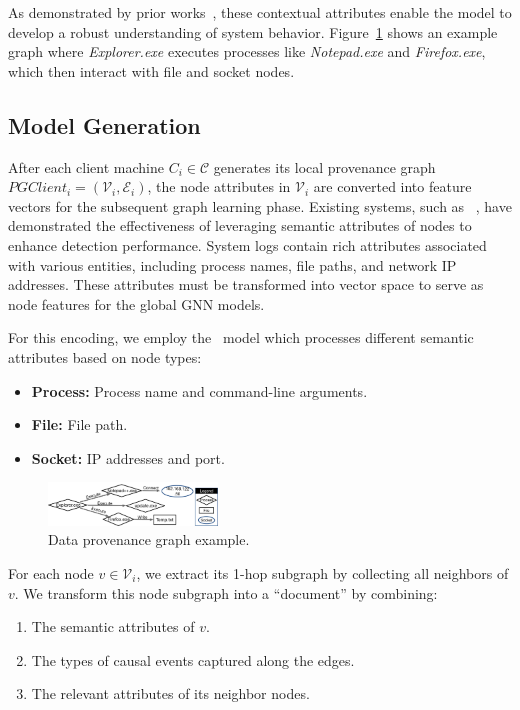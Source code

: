 As demonstrated by prior works~\cite{flash2024,cheng2023kairos}, these contextual attributes enable the model to develop a robust understanding of system behavior. Figure~\ref{provexp} shows an example graph where \textit{Explorer.exe} executes processes like \textit{Notepad.exe} and \textit{Firefox.exe}, which then interact with file and socket nodes.



\subsection{\wordvec Model Generation}
\label{sub:word2vec:model}

After each client machine \(C_i\in \mathcal{C}\) generates its local provenance graph \(PGClient_{i} = (\mathcal{V}_i, \mathcal{E}_i)\), the node attributes in \(\mathcal{V}_i\) are converted into feature vectors for the subsequent graph learning phase. Existing systems, such as \flash~\cite{flash2024}, have demonstrated the effectiveness of leveraging semantic attributes of nodes to enhance detection performance. System logs contain rich attributes associated with various entities, including process names, file paths, and network IP addresses. These attributes must be transformed into vector space to serve as node features for the global GNN models.

For this encoding, we employ the \wordvec~model which processes different semantic attributes based on node types:
\begin{itemize}[itemsep=0.1em, parsep=0em, topsep=0em, leftmargin=*]
    \item \textbf{Process:} Process name and command-line arguments.
    \item \textbf{File:} File path.
    \item \textbf{Socket:} IP addresses and port.
\end{itemize}

\begin{figure}[t!]
    \centering
    \includegraphics[width=0.4\textwidth]{fig/provexp.pdf}
    \caption{Data provenance graph example.}
    \label{provexp}
    \vspace{-3ex}
  \end{figure}
  

For each node \(v \in \mathcal{V}_i\), we extract its 1-hop subgraph by collecting all neighbors of \(v\). We transform this node subgraph into a ``document'' by combining:
\begin{enumerate}[itemsep=0.1em, parsep=0em, topsep=0em, leftmargin=*]
    \item The semantic attributes of \(v\).
    \item The types of causal events captured along the edges.
    \item The relevant attributes of its neighbor nodes.
\end{enumerate}

